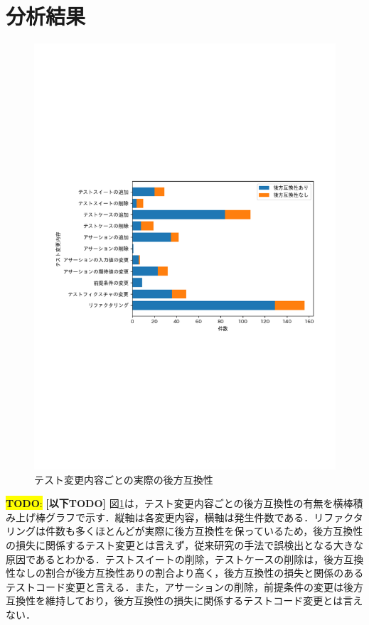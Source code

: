 \documentclass[11pt,dvipdfmx]{jreport}
\newcommand{\todo}[1]{\colorbox{yellow}{{\bf TODO}:}{\color{red} {\textbf{[#1]}}}}
\begin{document}
\section{分析結果}
\begin{figure}[t]
  \label{fig:test_pattern}
  \centering
  \includegraphics[width=1.0\linewidth]{fig/barh-test-pattern.pdf}
  \caption{テスト変更内容ごとの実際の後方互換性}
\end{figure}

\todo{以下TODO}
図\ref{fig:test_pattern}は，テスト変更内容ごとの後方互換性の有無を横棒積み上げ棒グラフで示す．縦軸は各変更内容，横軸は発生件数である．リファクタリングは件数も多くほとんどが実際に後方互換性を保っているため，後方互換性の損失に関係するテスト変更とは言えず，従来研究の手法で誤検出となる大きな原因であるとわかる．テストスイートの削除，テストケースの削除は，後方互換性なしの割合が後方互換性ありの割合より高く，後方互換性の損失と関係のあるテストコード変更と言える．また，アサーションの削除，前提条件の変更は後方互換性を維持しており，後方互換性の損失に関係するテストコード変更とは言えない．
\end{document}
